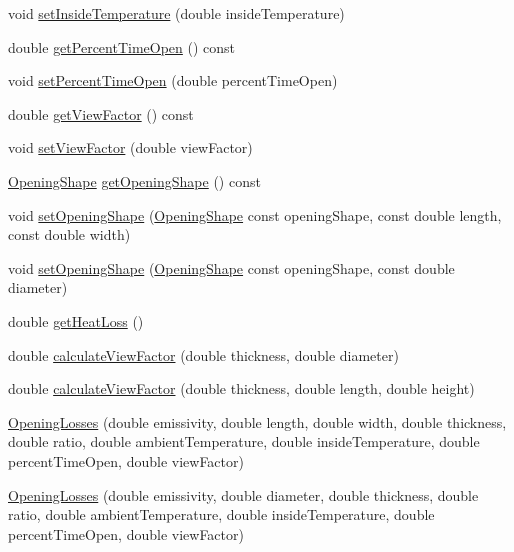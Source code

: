 \begin{DoxyCompactItemize}
void \hyperlink{class_opening_losses_a895dcaa81bbb3dc823ec903480f05262}{set\+Inside\+Temperature} (double inside\+Temperature)
\item 
double \hyperlink{class_opening_losses_aeefc3790a569008ff2e804033a9efea3}{get\+Percent\+Time\+Open} () const
\item 
void \hyperlink{class_opening_losses_a889b6aa25bf6d8fc8fb284ec0c2a1625}{set\+Percent\+Time\+Open} (double percent\+Time\+Open)
\item 
double \hyperlink{class_opening_losses_ae6633fab7a941e00b9770bee6a3af34d}{get\+View\+Factor} () const
\item 
void \hyperlink{class_opening_losses_a4e6c6f1549e01cd4b82b7505e403d643}{set\+View\+Factor} (double view\+Factor)
\item 
\hyperlink{class_opening_losses_a57f9759b6fd72a1b75aa885800e26157}{Opening\+Shape} \hyperlink{class_opening_losses_a5046cd699178e4edca774d0d0da7965a}{get\+Opening\+Shape} () const
\item 
void \hyperlink{class_opening_losses_a19c28e02d1e736d74b3c82047d4d23b2}{set\+Opening\+Shape} (\hyperlink{class_opening_losses_a57f9759b6fd72a1b75aa885800e26157}{Opening\+Shape} const opening\+Shape, const double length, const double width)
\item 
void \hyperlink{class_opening_losses_afb0e0884b0e60db8cb6674228cf3aafe}{set\+Opening\+Shape} (\hyperlink{class_opening_losses_a57f9759b6fd72a1b75aa885800e26157}{Opening\+Shape} const opening\+Shape, const double diameter)
\item 
double \hyperlink{class_opening_losses_a38112eb408f72e252b42a68a41a25d0f}{get\+Heat\+Loss} ()
\item 
double \hyperlink{class_opening_losses_aa8ffc249e49ee7f8413f32f7e803524a}{calculate\+View\+Factor} (double thickness, double diameter)
\item 
double \hyperlink{class_opening_losses_abef4b1d97525d3cdab0bc5587ab12f91}{calculate\+View\+Factor} (double thickness, double length, double height)
\item 
\hyperlink{class_opening_losses_a74205733c9a9b328bd9bf15c73841a8f}{Opening\+Losses} (double emissivity, double length, double width, double thickness, double ratio, double ambient\+Temperature, double inside\+Temperature, double percent\+Time\+Open, double view\+Factor)
\item 
\hyperlink{class_opening_losses_af5406c6281fda46406456cdaa9d948fa}{Opening\+Losses} (double emissivity, double diameter, double thickness, double ratio, double ambient\+Temperature, double inside\+Temperature, double percent\+Time\+Open, double view\+Factor)

\end{DoxyCompactItemize}
